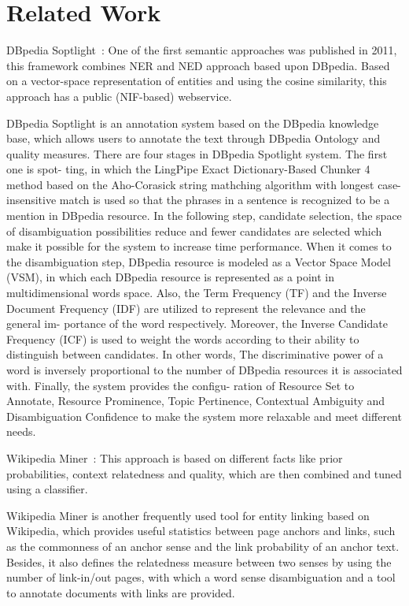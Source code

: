\section{Related Work} \label{related}

DBpedia Soptlight~\cite{DBLP:conf/i-semantics/MendesJGB11}: One of the first semantic approaches was published in 2011, this framework combines NER and NED approach based upon DBpedia. Based on a vector-space representation of entities and using the cosine similarity, this approach has a public (NIF-based) webservice.

DBpedia Soptlight is an annotation system based on the DBpedia knowledge base, which allows users to annotate the text through DBpedia Ontology and quality measures. There are four stages in DBpedia Spotlight system. The first one is spot- ting, in which the LingPipe Exact Dictionary-Based Chunker 4 method based on the Aho-Corasick string mathching algorithm with longest case-insensitive match is used so that the phrases in a sentence is recognized to be a mention in DBpedia resource. In the following step, candidate selection, the space of disambiguation possibilities reduce and fewer candidates are selected which make it possible for the system to increase time performance. When it comes to the disambiguation step, DBpedia resource is modeled as a Vector Space Model (VSM), in which each DBpedia resource is represented as a point in multidimensional words space. Also, the Term Frequency (TF) and the Inverse Document Frequency (IDF) are utilized to represent the relevance and the general im- portance of the word respectively. Moreover, the Inverse Candidate Frequency (ICF) is used to weight the words according to their ability to distinguish between candidates. In other words, The discriminative power of a word is inversely proportional to the number of DBpedia resources it is associated with. Finally, the system provides the configu- ration of Resource Set to Annotate, Resource Prominence, Topic Pertinence, Contextual Ambiguity and Disambiguation Confidence to make the system more relaxable and meet different needs.



Wikipedia Miner~\cite{DBLP:conf/cikm/MilneW08}: This approach is based on different facts like prior probabilities, context relatedness and quality, which are then combined and tuned using a classifier.

Wikipedia Miner is another frequently used tool for entity linking based on Wikipedia, which provides useful statistics between page anchors and links, such as the commonness of an anchor sense and the link probability of an anchor text. Besides, it also defines the relatedness measure between two senses by using the number of link-in/out pages, with which a word sense disambiguation and a tool to annotate documents with links are provided.

